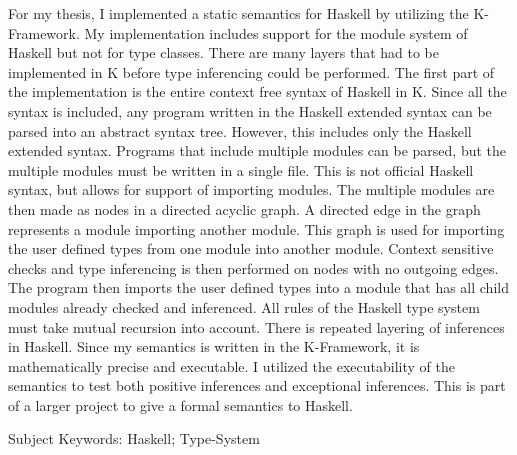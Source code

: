 For my thesis, I implemented a static semantics for Haskell by utilizing the K-Framework. My implementation includes support for the module system of Haskell but not for type classes. There are many layers that had to be implemented in K before type inferencing could be performed. The first part of the implementation is the entire context free syntax of Haskell in K. Since all the syntax is included, any program written in the Haskell extended syntax can be parsed into an abstract syntax tree. However, this includes only the Haskell extended syntax. Programs that include multiple modules can be parsed, but the multiple modules must be written in a single file. This is not official Haskell syntax, but allows for support of importing modules. The multiple modules are then made as nodes in a directed acyclic graph. A directed edge in the graph represents a module importing another module. This graph is used for importing the user defined types from one module into another module. Context sensitive checks and type inferencing is then performed on nodes with no outgoing edges. The program then imports the user defined types into a module that has all child modules already checked and inferenced. All rules of the Haskell type system must take mutual recursion into account. There is repeated layering of inferences in Haskell. Since my semantics is written in the K-Framework, it is mathematically precise and executable. I utilized the executability of the semantics to test both positive inferences and exceptional inferences. This is part of a larger project to give a formal semantics to Haskell.

Subject Keywords: Haskell; Type-System
